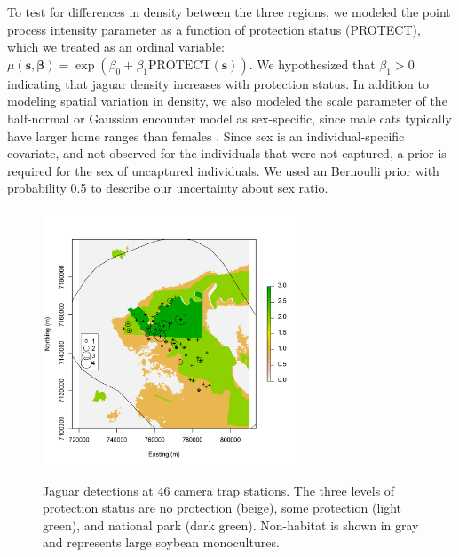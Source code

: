 To test for differences in
density between the three regions, we modeled the point process intensity parameter
as a function of protection status (PROTECT), which we treated as an
ordinal variable: $\mu(\mathbf{s}, \bm{\beta}) = \exp(\beta_0 +
\beta_1\text{PROTECT}(\mathbf{s}))$. We hypothesized that $\beta_1 > 0$
indicating that jaguar density increases with protection status. In
addition to modeling spatial variation in density, we also modeled the
scale parameter of the half-normal or Gaussian encounter model as
sex-specific, since male cats typically have larger home ranges than
females \citep{sollmann_etal:2011}. Since sex is an
individual-specific covariate, and not observed for the individuals
that were not captured, a prior is required for the sex of uncaptured
individuals. We used an Bernoulli prior with probability 0.5 to
describe our uncertainty about sex ratio.

\begin{figure}%
\centering
\includegraphics[width=3in,height=3in]{Ch11/figs/jaguarCountMap}
\label{state-space.fig.jaguarCts}
\caption{Jaguar detections at 46 camera trap stations. The three levels of
  protection status are no protection (beige), some protection (light
  green), and national park (dark green). Non-habitat is shown in gray
  and represents large soybean monocultures. }
\end{figure}

